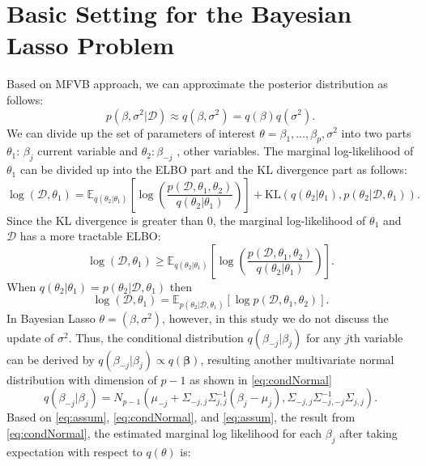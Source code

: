\section{Basic Setting for the Bayesian Lasso Problem}
Based on MFVB approach, we can approximate the posterior distribution as follows:
\begin{equation}
	\label{eq:assum}
	p(\beta,\sigma^2|\mathcal{D})\approx q(\beta,\sigma^2) = q(\beta)q(\sigma^2).
\end{equation}
We can divide up the set of parameters of interest $\theta = {\beta_1,\ldots,\beta_p, \sigma^2}$ into two parts
$\theta_1$: $\beta_j$ current variable and $\theta_{2}: \beta_{-j}$ , other variables.
The marginal log-likelihood of $\theta_1$ can be divided up into the ELBO part and the KL divergence part as follows:
\begin{equation}
	\label{LocalGlobalVI}
	\log(\mathcal{D},\theta_1) = \mathbb{E}_{q(\theta_{2}|\theta_1)}\left[ \log\left(\frac{p(\mathcal{D},\theta_1,\theta_{2})}{q(\theta_{2}|\theta_1)} \right)\right] + \text{KL}(q(\theta_{2}|\theta_1),p(\theta_{2}|\mathcal{D},\theta_1)).
\end{equation}
Since the KL divergence is greater than 0, the marginal log-likelihood of $\theta_1$ and $\mathcal{D}$ has a more tractable ELBO: 
\begin{equation}
	\log(\mathcal{D},\theta_1) \geq \mathbb{E}_{q(\theta_{2}|\theta_1)}\left[\log\left(\frac{p(\mathcal{D},\theta_1,\theta_{2})}{q(\theta_{2}|\theta_1)} \right)\right].
\end{equation}
When $q(\theta_{2}|\theta_1) = p(\theta_{2}|\mathcal{D},\theta_1)$ then 
$$
\log(\mathcal{D},\theta_1) = \mathbb{E}_{p(\theta_{2}|\mathcal{D},\theta_1)}[\log p(\mathcal{D},\theta_1,\theta_{2})].
$$
In Bayesian Lasso $\theta = (\beta,\sigma^2)$, however, in this study we do not discuss the update of $\sigma^2$. Thus,
the conditional distribution $q(\beta_{-j}|\beta_{j})$ for any $j$th variable can be derived by $q(\beta_{-j}|\beta_{j}) \propto q(\mathbf{\beta})$, resulting another multivariate normal distribution with dimension of $p-1$ as shown in \autoref{eq:condNormal}
\begin{equation}
	\label{eq:condNormal}
	q(\beta_{-j}|\beta_{j}) = N_{p-1}(\mu_{-j}+\Sigma_{-j,j}\Sigma_{j,j}^{-1}(\beta_j-\mu_j), \Sigma_{-j,j} \Sigma_{-j,-j}^{-1}\Sigma_{j,j}).
\end{equation}
Based on \autoref{eq:assum}, \autoref{eq:condNormal}, and  \autoref{eq:assum}, the result from \autoref{eq:condNormal}, the estimated marginal log likelihood for each $\beta_j$ after taking expectation with respect to $q(\theta)$ is:
